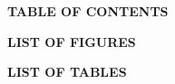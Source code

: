 \newpage
\thispagestyle{plain}

\begin{center}
{\LARGE \bfseries \color{primaryblue} TABLE OF CONTENTS}\\[0.2cm]
\end{center}

\vspace{-0.3cm}
\begingroup
\setcounter{tocdepth}{1}
\renewcommand{\contentsname}{\vspace{-0.8cm}}
{\small
\tableofcontents
}
\endgroup

\vspace{0.4cm}
\begin{center}
{\Large \bfseries \color{primaryblue} LIST OF FIGURES}\\[0.2cm]
\end{center}
\vspace{-0.3cm}
\begingroup
\renewcommand{\listfigurename}{\vspace{-0.8cm}}
{\small
\listoffigures
}
\endgroup

\vspace{0.4cm}
\begin{center}
{\Large \bfseries \color{primaryblue} LIST OF TABLES}\\[0.2cm]
\end{center}
\vspace{-0.3cm}
\begingroup
\renewcommand{\listtablename}{\vspace{-0.8cm}}
{\small
\listoftables
}
\endgroup
